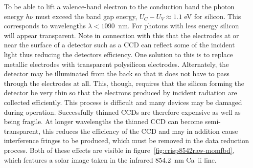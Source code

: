 To be able to lift a valence-band electron to the conduction band the
photon energy $h\nu$ must exceed the band gap energy, $U_C-U_V \approx
1.1$ eV for silicon. This corresponds to wavelengths $\lambda < 1090$~nm. 
For photons with less energy silicon will appear transparent. Note in 
connection with this that the electrodes at or near the surface of a
detector such as a CCD can reflect some of the incident light thus reducing
the detectors efficiency. One solution to this is to replace 
metallic electrodes with transparent polysilicon electrodes. Alternately,
the detector may be illuminated from the back so that it does not have to
pass through the electrodes at all. This, though, requires that the silicon
forming the detector be very thin so that the electrons produced by 
incident radiation are collected efficiently. This process is difficult
and many devices may be damaged during operation. Successfully thinned
CCDs are therefore expensive as well as being fragile. At longer 
wavelengths the thinned CCD can become semi-transparent, this reduces the
efficiency of the CCD and may in addition cause interference fringes 
to be produced, which must be removed in the data reduction process. Both
of these effects are visible in figure~\ref{fig:crisp8542raw-momfbd}, which
features a solar image taken in the infrared 854.2~nm Ca~{\sc ii} line.

